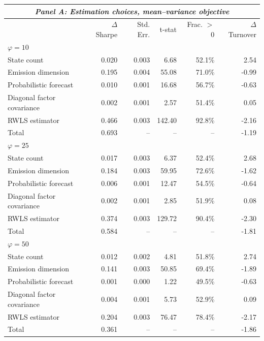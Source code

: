 \begin{tabular*}{\textwidth}{l@{\extracolsep{\fill}}rrrrr}
\toprule
\multicolumn{6}{c}{\textit{Panel A: Estimation choices, mean--variance objective}} \\
\midrule
 & $\Delta$ Sharpe & Std. Err. & t-stat & Frac. $>$ 0 & $\Delta$ Turnover \\
\midrule
\multicolumn{6}{l}{\textit{$\varphi = 10$}} \\
\midrule
State count & 0.020\rlap{$^{***}$}\phantom{$^{***}$} & 0.003 & 6.68 & 52.1\% & 2.54 \\
Emission dimension & 0.195\rlap{$^{***}$}\phantom{$^{***}$} & 0.004 & 55.08 & 71.0\% & -0.99 \\
Probabilistic forecast & 0.010\rlap{$^{***}$}\phantom{$^{***}$} & 0.001 & 16.68 & 56.7\% & -0.63 \\
Diagonal factor covariance & 0.002\rlap{$^{**}$}\phantom{$^{***}$} & 0.001 & 2.57 & 51.4\% & 0.05 \\
RWLS estimator & 0.466\rlap{$^{***}$}\phantom{$^{***}$} & 0.003 & 142.40 & 92.8\% & -2.16 \\
Total & 0.693\phantom{$^{***}$} & -- & -- & -- & -1.19 \\
\midrule
\multicolumn{6}{l}{\textit{$\varphi = 25$}} \\
\midrule
State count & 0.017\rlap{$^{***}$}\phantom{$^{***}$} & 0.003 & 6.37 & 52.4\% & 2.68 \\
Emission dimension & 0.184\rlap{$^{***}$}\phantom{$^{***}$} & 0.003 & 59.95 & 72.6\% & -1.62 \\
Probabilistic forecast & 0.006\rlap{$^{***}$}\phantom{$^{***}$} & 0.001 & 12.47 & 54.5\% & -0.64 \\
Diagonal factor covariance & 0.002\rlap{$^{***}$}\phantom{$^{***}$} & 0.001 & 2.85 & 51.9\% & 0.08 \\
RWLS estimator & 0.374\rlap{$^{***}$}\phantom{$^{***}$} & 0.003 & 129.72 & 90.4\% & -2.30 \\
Total & 0.584\phantom{$^{***}$} & -- & -- & -- & -1.81 \\
\midrule
\multicolumn{6}{l}{\textit{$\varphi = 50$}} \\
\midrule
State count & 0.012\rlap{$^{***}$}\phantom{$^{***}$} & 0.002 & 4.81 & 51.8\% & 2.74 \\
Emission dimension & 0.141\rlap{$^{***}$}\phantom{$^{***}$} & 0.003 & 50.85 & 69.4\% & -1.89 \\
Probabilistic forecast & 0.001\phantom{$^{***}$} & 0.000 & 1.22 & 49.5\% & -0.63 \\
Diagonal factor covariance & 0.004\rlap{$^{***}$}\phantom{$^{***}$} & 0.001 & 5.73 & 52.9\% & 0.09 \\
RWLS estimator & 0.204\rlap{$^{***}$}\phantom{$^{***}$} & 0.003 & 76.47 & 78.4\% & -2.17 \\
Total & 0.361\phantom{$^{***}$} & -- & -- & -- & -1.86 \\
\midrule[\heavyrulewidth]
\end{tabular*}

